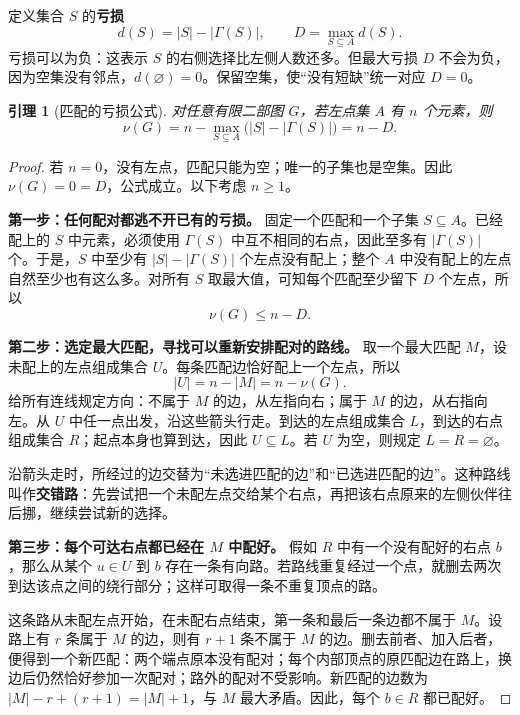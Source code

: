 \documentclass[UTF8,a4paper,oneside,openany,fontset=fandol,zihao=-4]{ctexbook}
\theoremstyle{guide}
\newtheorem{lemma}[theorem]{引理}
\begin{document}
定义集合 $S$ 的\textbf{亏损}
\[
d(S)=|S|-|\Gamma(S)|,
\qquad
D=\max_{S\subseteq A}d(S).
\]
亏损可以为负：这表示 $S$ 的右侧选择比左侧人数还多。但最大亏损 $D$ 不会为负，因为空集没有邻点，$d(\varnothing)=0$。保留空集，使“没有短缺”统一对应 $D=0$。

\begin{lemma}[匹配的亏损公式]\label{lem:hall-deficiency}
对任意有限二部图 $G$，若左点集 $A$ 有 $n$ 个元素，则
\begin{equation}\label{mat:deficiency-formula}
\nu(G)=n-\max_{S\subseteq A}\bigl(|S|-|\Gamma(S)|\bigr)=n-D.
\end{equation}
\end{lemma}

\begin{proof}
若 $n=0$，没有左点，匹配只能为空；唯一的子集也是空集。因此 $\nu(G)=0=D$，公式成立。以下考虑 $n\geq1$。

\textbf{第一步：任何配对都逃不开已有的亏损。}
固定一个匹配和一个子集 $S\subseteq A$。已经配上的 $S$ 中元素，必须使用 $\Gamma(S)$ 中互不相同的右点，因此至多有 $|\Gamma(S)|$ 个。于是，$S$ 中至少有 $|S|-|\Gamma(S)|$ 个左点没有配上；整个 $A$ 中没有配上的左点自然至少也有这么多。对所有 $S$ 取最大值，可知每个匹配至少留下 $D$ 个左点，所以
\begin{equation}\label{mat:easy-direction}
\nu(G)\leq n-D.
\end{equation}

\textbf{第二步：选定最大匹配，寻找可以重新安排配对的路线。}
取一个最大匹配 $M$，设未配上的左点组成集合 $U$。每条匹配边恰好配上一个左点，所以
\[
|U|=n-|M|=n-\nu(G).
\]
给所有连线规定方向：不属于 $M$ 的边，从左指向右；属于 $M$ 的边，从右指向左。从 $U$ 中任一点出发，沿这些箭头行走。到达的左点组成集合 $L$，到达的右点组成集合 $R$；起点本身也算到达，因此 $U\subseteq L$。若 $U$ 为空，则规定 $L=R=\varnothing$。

沿箭头走时，所经过的边交替为“未选进匹配的边”和“已选进匹配的边”。这种路线叫作\textbf{交错路}：先尝试把一个未配左点交给某个右点，再把该右点原来的左侧伙伴往后挪，继续尝试新的选择。

\textbf{第三步：每个可达右点都已经在 $M$ 中配好。}
假如 $R$ 中有一个没有配好的右点 $b$，那么从某个 $u\in U$ 到 $b$ 存在一条有向路。若路线重复经过一个点，就删去两次到达该点之间的绕行部分；这样可取得一条不重复顶点的路。

这条路从未配左点开始，在未配右点结束，第一条和最后一条边都不属于 $M$。设路上有 $r$ 条属于 $M$ 的边，则有 $r+1$ 条不属于 $M$ 的边。删去前者、加入后者，便得到一个新匹配：两个端点原本没有配对；每个内部顶点的原匹配边在路上，换边后仍然恰好参加一次配对；路外的配对不受影响。新匹配的边数为 $|M|-r+(r+1)=|M|+1$，与 $M$ 最大矛盾。因此，每个 $b\in R$ 都已配好。


\end{proof}
\end{document}
